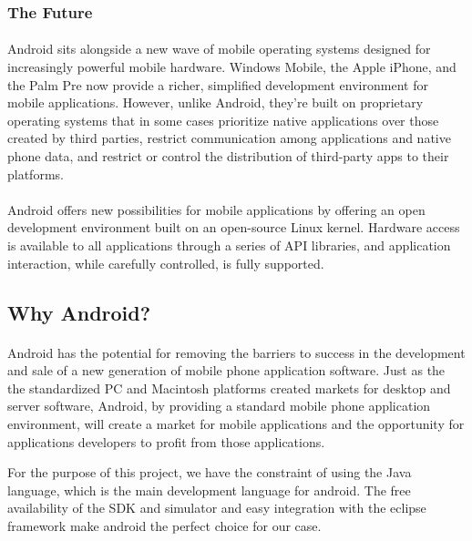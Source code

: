 \subsubsection{The Future}

\paragraph{}
Android sits alongside a new wave of mobile operating systems designed for increasingly powerful mobile hardware. Windows Mobile, the Apple iPhone, and the Palm Pre now provide a richer, simplified development environment for mobile applications. However, unlike Android, they’re built on proprietary operating systems that in some cases prioritize native applications over those created by third parties, restrict communication among applications and native phone data, and restrict or control the distribution of third-party apps to their platforms.

\paragraph{}
Android offers new possibilities for mobile applications by offering an open development environment built on an open-source Linux kernel. Hardware access is available to all applications through a series of API libraries, and application interaction, while carefully controlled, is fully supported.

\subsection{Why Android?}
\paragraph{}
Android has the potential for removing the barriers to success in the development and sale of a new generation of mobile phone application software. Just as the the standardized PC and Macintosh platforms created markets for desktop and server software, Android, by providing a standard mobile phone application environment, will create a market for mobile applications and the opportunity for applications developers to profit from those applications.

For the purpose of this project, we have the constraint of using the Java language, which is the main development language for android. The free availability of the SDK and simulator and easy integration with the eclipse framework make android the perfect choice for our case.

